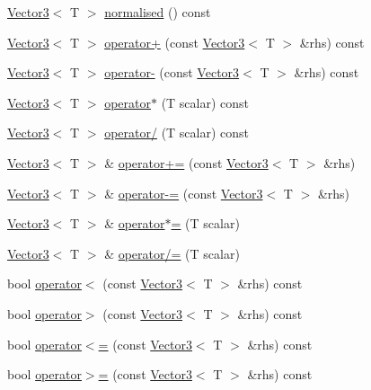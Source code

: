 \begin{DoxyCompactItemize}
\mbox{\hyperlink{class_vector3}{Vector3}}$<$ T $>$ \mbox{\hyperlink{class_vector3_a527c54e392f3aa4b942df2eb7aa3b38b}{normalised}} () const
\item 
\mbox{\hyperlink{class_vector3}{Vector3}}$<$ T $>$ \mbox{\hyperlink{class_vector3_ae773f6324d5ee80b042632297e573400}{operator+}} (const \mbox{\hyperlink{class_vector3}{Vector3}}$<$ T $>$ \&rhs) const
\item 
\mbox{\hyperlink{class_vector3}{Vector3}}$<$ T $>$ \mbox{\hyperlink{class_vector3_a385caaf9d5ce60bc720b8304d9c98937}{operator-\/}} (const \mbox{\hyperlink{class_vector3}{Vector3}}$<$ T $>$ \&rhs) const
\item 
\mbox{\hyperlink{class_vector3}{Vector3}}$<$ T $>$ \mbox{\hyperlink{class_vector3_af1a6bd4542b3cb1d78fb90b81f9b3763}{operator$\ast$}} (T scalar) const
\item 
\mbox{\hyperlink{class_vector3}{Vector3}}$<$ T $>$ \mbox{\hyperlink{class_vector3_a50099461c7eeb5471b022918de5c86c3}{operator/}} (T scalar) const
\item 
\mbox{\hyperlink{class_vector3}{Vector3}}$<$ T $>$ \& \mbox{\hyperlink{class_vector3_a46410fa08aa469fe979bc29601ee18f0}{operator+=}} (const \mbox{\hyperlink{class_vector3}{Vector3}}$<$ T $>$ \&rhs)
\item 
\mbox{\hyperlink{class_vector3}{Vector3}}$<$ T $>$ \& \mbox{\hyperlink{class_vector3_a57ae63fe916c0042a46545780b23c05e}{operator-\/=}} (const \mbox{\hyperlink{class_vector3}{Vector3}}$<$ T $>$ \&rhs)
\item 
\mbox{\hyperlink{class_vector3}{Vector3}}$<$ T $>$ \& \mbox{\hyperlink{class_vector3_af44f1cfdedf62a46e803d838ed6640ad}{operator$\ast$=}} (T scalar)
\item 
\mbox{\hyperlink{class_vector3}{Vector3}}$<$ T $>$ \& \mbox{\hyperlink{class_vector3_a1fa0486589a5b3e0110902bb5ffa6d71}{operator/=}} (T scalar)
\item 
bool \mbox{\hyperlink{class_vector3_ae62b088c2abf8ad6620d83565812ad60}{operator$<$}} (const \mbox{\hyperlink{class_vector3}{Vector3}}$<$ T $>$ \&rhs) const
\item 
bool \mbox{\hyperlink{class_vector3_a87afbd96a97adff42c58bde870af47c4}{operator$>$}} (const \mbox{\hyperlink{class_vector3}{Vector3}}$<$ T $>$ \&rhs) const
\item 
bool \mbox{\hyperlink{class_vector3_ac7cd56bfa861b5f99b3891f220f86d44}{operator$<$=}} (const \mbox{\hyperlink{class_vector3}{Vector3}}$<$ T $>$ \&rhs) const
\item 
bool \mbox{\hyperlink{class_vector3_a9c0fd2c3f2cce9af0711f9ea40bff86a}{operator$>$=}} (const \mbox{\hyperlink{class_vector3}{Vector3}}$<$ T $>$ \&rhs) const

\end{DoxyCompactItemize}

